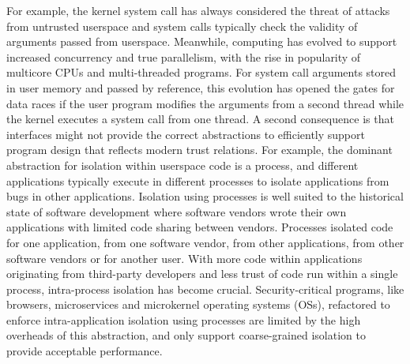 For example, the kernel system call has always considered the threat
of attacks from untrusted userspace and system calls typically check the 
validity of arguments passed from userspace.
Meanwhile, computing has evolved to support increased concurrency and true 
parallelism, with the rise in popularity of multicore CPUs and multi-threaded 
programs.
For system call arguments stored in user memory and passed by reference,
this evolution has opened the gates for data races if the user program
modifies the arguments from a second thread while the kernel executes
a system call from one thread.
A second consequence is that interfaces might not provide the correct
abstractions to efficiently support program design that reflects
modern trust relations.
For example, the dominant abstraction for isolation within userspace code
is a process, and different applications typically execute in different 
processes to isolate applications from bugs in other applications.
Isolation using processes is well suited to the historical state of software
development where software vendors wrote their own applications with limited
code sharing between vendors.
Processes isolated code for one application, from one software vendor,
from other applications, from other software vendors or for another user.
With more code within applications originating from third-party developers
and less trust of code run within a single process, intra-process isolation
has become crucial.
Security-critical programs, like browsers, microservices and microkernel
operating systems (OSs), refactored to enforce intra-application isolation 
using processes are limited by the high overheads of this abstraction, and 
only support coarse-grained isolation to provide acceptable performance.


